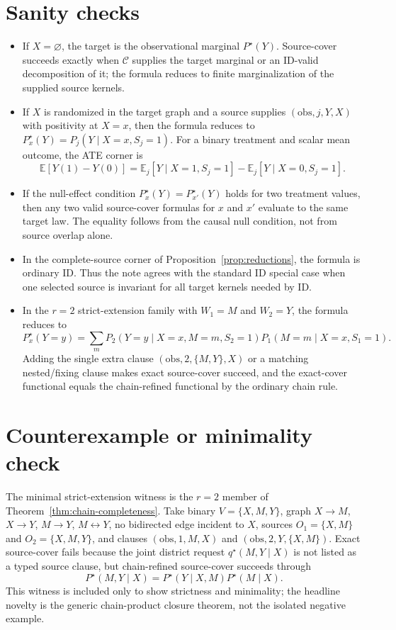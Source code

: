 \documentclass[11pt]{article}
\newcommand{\E}{\mathbb{E}}
\theoremstyle{definition}
\theoremstyle{plain}
\theoremstyle{remark}
\begin{document}
\section{Sanity checks}
\begin{itemize}[leftmargin=*]
\item If \(X=\varnothing\), the target is the observational marginal
\(P^\star(Y)\).  Source-cover succeeds exactly when \(\mathcal C\) supplies
the target marginal or an ID-valid decomposition of it; the formula reduces
to finite marginalization of the supplied source kernels.
\item If \(X\) is randomized in the target graph and a source supplies
\((\mathrm{obs},j,Y,X)\) with positivity at \(X=x\), then the formula reduces
to \(P^\star_x(Y)=P_j(Y\mid X=x,S_j=1)\).  For a binary treatment and scalar
mean outcome, the ATE corner is
\[
  \E[Y(1)-Y(0)]
  =
  \E_j[Y\mid X=1,S_j=1]-\E_j[Y\mid X=0,S_j=1].
\]
\item If the null-effect condition \(P^\star_x(Y)=P^\star_{x'}(Y)\) holds for
two treatment values, then any two valid source-cover formulas for \(x\) and
\(x'\) evaluate to the same target law.  The equality follows from the causal
null condition, not from source overlap alone.
\item In the complete-source corner of Proposition~\ref{prop:reductions},
the formula is ordinary ID.  Thus the note agrees with the standard ID
special case when one selected source is invariant for all target kernels
needed by ID.
\item In the \(r=2\) strict-extension family with \(W_1=M\) and \(W_2=Y\),
the formula reduces to
\[
  P^\star_x(Y=y)
  =
  \sum_m
    P_2(Y=y\mid X=x,M=m,S_2=1)
    P_1(M=m\mid X=x,S_1=1).
\]
Adding the single extra clause \((\mathrm{obs},2,\{M,Y\},X)\) or a matching
nested/fixing clause makes exact source-cover succeed, and the exact-cover
functional equals the chain-refined functional by the ordinary chain rule.
\end{itemize}

\section{Counterexample or minimality check}
The minimal strict-extension witness is the \(r=2\) member of
Theorem~\ref{thm:chain-completeness}.  Take binary
\(V=\{X,M,Y\}\), graph \(X\to M\), \(X\to Y\), \(M\to Y\),
\(M\leftrightarrow Y\), no bidirected edge incident to \(X\), sources
\(O_1=\{X,M\}\) and
\(O_2=\{X,M,Y\}\), and clauses \((\mathrm{obs},1,M,X)\) and
\((\mathrm{obs},2,Y,\{X,M\})\).  Exact source-cover fails because the joint
district request \(q^\star(M,Y\mid X)\) is not listed as a typed source
clause, but chain-refined source-cover succeeds through
\[
  P^\star(M,Y\mid X)=P^\star(Y\mid X,M)P^\star(M\mid X).
\]
This witness is included only to show strictness and minimality; the headline
novelty is the generic chain-product closure theorem, not the isolated
negative example.
\end{document}
